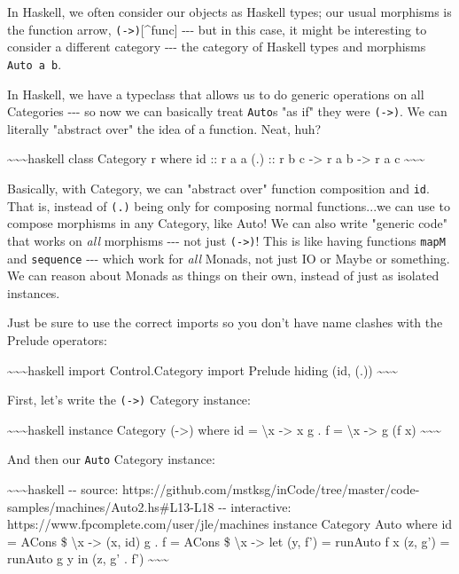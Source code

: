 \documentclass[]{article}
\begin{document}
In Haskell, we often consider our objects as Haskell types; our usual morphisms
is the function arrow, \texttt{(-\textgreater{})}{[}\^{}func{]} -\/-\/- but in
this case, it might be interesting to consider a different category -\/-\/- the
category of Haskell types and morphisms \texttt{Auto\ a\ b}.

In Haskell, we have a typeclass that allows us to do generic operations on all
Categories -\/-\/- so now we can basically treat \texttt{Auto}s "as if" they
were \texttt{(-\textgreater{})}. We can literally "abstract over" the idea of a
function. Neat, huh?

\textasciitilde{}\textasciitilde{}\textasciitilde{}haskell class Category r
where id :: r a a (.) :: r b c -\textgreater{} r a b -\textgreater{} r a c
\textasciitilde{}\textasciitilde{}\textasciitilde{}

Basically, with Category, we can "abstract over" function composition and
\texttt{id}. That is, instead of \texttt{(.)} being only for composing normal
functions...we can use to compose morphisms in any Category, like Auto! We can
also write "generic code" that works on \emph{all} morphisms -\/-\/- not just
\texttt{(-\textgreater{})}! This is like having functions \texttt{mapM} and
\texttt{sequence} -\/-\/- which work for \emph{all} Monads, not just IO or Maybe
or something. We can reason about Monads as things on their own, instead of just
as isolated instances.

Just be sure to use the correct imports so you don't have name clashes with the
Prelude operators:

\textasciitilde{}\textasciitilde{}\textasciitilde{}haskell import
Control.Category import Prelude hiding (id, (.))
\textasciitilde{}\textasciitilde{}\textasciitilde{}

First, let's write the \texttt{(-\textgreater{})} Category instance:

\textasciitilde{}\textasciitilde{}\textasciitilde{}haskell instance Category
(-\textgreater{}) where id = \textbackslash{}x -\textgreater{} x g . f =
\textbackslash{}x -\textgreater{} g (f x)
\textasciitilde{}\textasciitilde{}\textasciitilde{}

And then our \texttt{Auto} Category instance:

\textasciitilde{}\textasciitilde{}\textasciitilde{}haskell -\/- source:
https://github.com/mstksg/inCode/tree/master/code-samples/machines/Auto2.hs\#L13-L18
-\/- interactive: https://www.fpcomplete.com/user/jle/machines instance Category
Auto where id = ACons \$ \textbackslash{}x -\textgreater{} (x, id) g . f = ACons
\$ \textbackslash{}x -\textgreater{} let (y, f') = runAuto f x (z, g') = runAuto
g y in (z, g' . f') \textasciitilde{}\textasciitilde{}\textasciitilde{}
\end{document}
